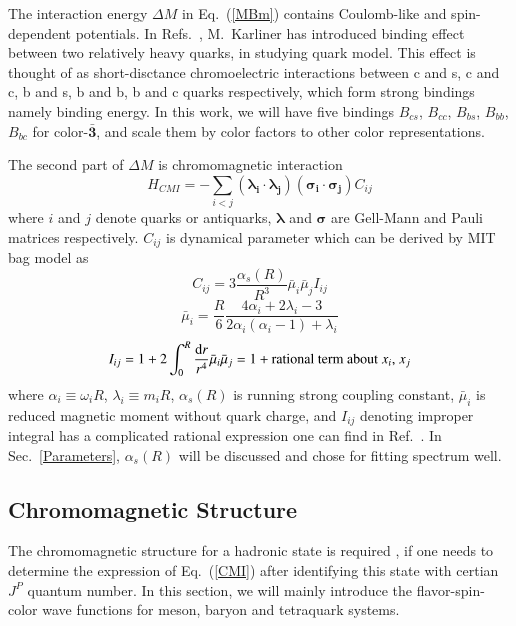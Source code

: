 \documentclass[prd,twocolumn,floatfix,nofootinbib]{revtex4}
\begin{document}
The interaction energy $\Delta M$ in Eq.~(\ref{MBm}) contains Coulomb-like and spin-dependent potentials.
In Refs.~\cite{Karliner:2014gca}, M.~Karliner has introduced binding effect between two relatively heavy quarks, in studying quark model.
This effect is thought of as short-disctance chromoelectric interactions between c and s, c and c, b and s, b and b, b and c quarks respectively, 
which form strong bindings namely binding energy. In this work, we will have five bindings $B_{cs}$, $B_{cc}$, $B_{bs}$, $B_{bb}$, $B_{bc}$ for color-$\boldsymbol{\bar{3}}$, 
and scale them by color factors to other color representations.

The second part of $\Delta M$ is chromomagnetic interaction
\begin{equation}\label{CMI}
    H_{CMI}=-\sum_{i<j} \left(\boldsymbol{\lambda_{i}}\cdot \boldsymbol{\lambda_{j}}\right) \left(\boldsymbol{\sigma_{i}}\cdot \boldsymbol{\sigma_{j}}\right)C_{ij}
\end{equation}
where $i$ and $j$ denote quarks or antiquarks, $\boldsymbol{\lambda}$ and $\boldsymbol{\sigma}$ are Gell-Mann and Pauli matrices respectively. 
$C_{ij}$ is dynamical parameter which can be derived by MIT bag model as
\begin{equation}\label{Cij}
    C_{ij}=3\frac{\alpha_{s}\left(R\right)}{R^{3}}\bar{\mu}_{i}\bar{\mu}_{j}I_{ij}
\end{equation}
\begin{equation}\label{muBari}
   \bar{\mu}_{i}=\frac{R}{6} \frac{4\alpha_{i}+2\lambda_{i}-3}{2\alpha_{i}\left(\alpha_{i}-1\right)+\lambda_{i}}
\end{equation}
\begin{equation}\label{Iij}
    I_{ij}=1+2\int_{0}^{R} \frac{{\rm d}r}{r^{4}} \bar{\mu}_{i}\bar{\mu}_{j}=
    1+\text{rational term about } x_{i} \text{, } x_{j}
\end{equation}
where $\alpha_{i}\equiv\omega_{i}R$, $\lambda_{i}\equiv m_{i}R$, $\alpha_{s}\left(R\right)$ is running strong coupling constant, $\bar{\mu}_{i}$ is reduced magnetic moment without quark charge,
and $I_{ij}$ denoting improper integral has a complicated rational expression one can find in Ref.~\cite{DeGrand:1975cf}. 
In Sec.~\ref{Parameters}, $\alpha_{s}\left(R\right)$ will be discussed and chose for fitting spectrum well.


\subsection{Chromomagnetic Structure}
The chromomagnetic structure for a hadronic state is required \cite{Luo:2017eub}, if one needs to determine the expression of Eq.~(\ref{CMI}) after identifying this state with certian $J^{P}$ quantum number.
In this section, we will mainly introduce the flavor-spin-color wave functions for meson, baryon and tetraquark systems.
\end{document}
